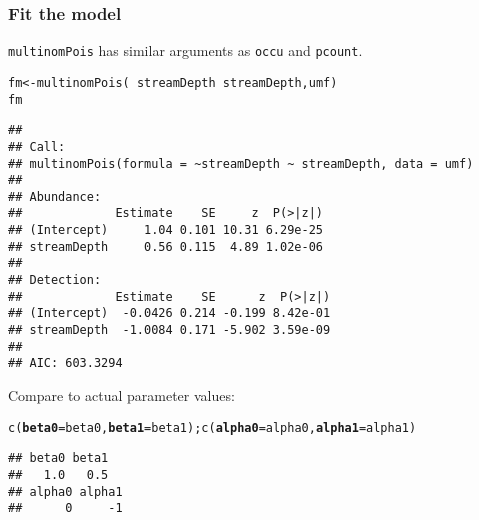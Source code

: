 \documentclass[color=usenames,dvipsnames]{beamer}\usepackage[]{graphicx}\usepackage[]{xcolor}
\makeatletter
\newcommand{\hlopt}[1]{\textcolor[rgb]{0,0,0}{#1}}%
\newcommand{\hldef}[1]{\textcolor[rgb]{0,0,0}{#1}}%
\newcommand{\hlkwb}[1]{\textcolor[rgb]{0,0.341,0.682}{#1}}%
\newcommand{\hlkwc}[1]{\textcolor[rgb]{0,0,0}{\textbf{#1}}}%
\newcommand{\hlkwd}[1]{\textcolor[rgb]{0.004,0.004,0.506}{#1}}%
\newenvironment{kframe}{%
 \def\at@end@of@kframe{}%
 \ifinner\ifhmode%
  \def\at@end@of@kframe{\end{minipage}}%
  \begin{minipage}{\columnwidth}%
 \fi\fi%
 \def\FrameCommand##1{\hskip\@totalleftmargin \hskip-\fboxsep
 \colorbox{shadecolor}{##1}\hskip-\fboxsep
     \hskip-\linewidth \hskip-\@totalleftmargin \hskip\columnwidth}%
 \MakeFramed {\advance\hsize-\width
   \@totalleftmargin\z@ \linewidth\hsize
   \@setminipage}}%
 {\par\unskip\endMakeFramed%
 \at@end@of@kframe}
\newenvironment{knitrout}{}{} %
\newcommand{\inr}[1]{\colorbox{inlinecolor}{\texttt{#1}}}
\makeatother
\begin{document}
\begin{frame}[fragile]
  \frametitle{Fit the model}
  \footnotesize
  \inr{multinomPois} has similar arguments as \inr{occu} and
  \inr{pcount}. 
\begin{knitrout}\tiny
{}\color{fgcolor}\begin{kframe}
\begin{alltt}
\hldef{fm} \hlkwb{<-} \hlkwd{multinomPois}\hldef{(}\hlopt{~}\hldef{streamDepth} \hlopt{~}\hldef{streamDepth, umf)}
\hldef{fm}
\end{alltt}
\begin{verbatim}
## 
## Call:
## multinomPois(formula = ~streamDepth ~ streamDepth, data = umf)
## 
## Abundance:
##             Estimate    SE     z  P(>|z|)
## (Intercept)     1.04 0.101 10.31 6.29e-25
## streamDepth     0.56 0.115  4.89 1.02e-06
## 
## Detection:
##             Estimate    SE      z  P(>|z|)
## (Intercept)  -0.0426 0.214 -0.199 8.42e-01
## streamDepth  -1.0084 0.171 -5.902 3.59e-09
## 
## AIC: 603.3294
\end{verbatim}
\end{kframe}
\end{knitrout}
\pause
\vfill
Compare to actual parameter values:
\vspace{-6pt}
\begin{knitrout}\tiny
{}\color{fgcolor}\begin{kframe}
\begin{alltt}
\hlkwd{c}\hldef{(}\hlkwc{beta0}\hldef{=beta0,} \hlkwc{beta1}\hldef{=beta1);} \hlkwd{c}\hldef{(}\hlkwc{alpha0}\hldef{=alpha0,} \hlkwc{alpha1}\hldef{=alpha1)}
\end{alltt}
\begin{verbatim}
## beta0 beta1 
##   1.0   0.5
## alpha0 alpha1 
##      0     -1
\end{verbatim}
\end{kframe}
\end{knitrout}
\end{frame}
\end{document}
